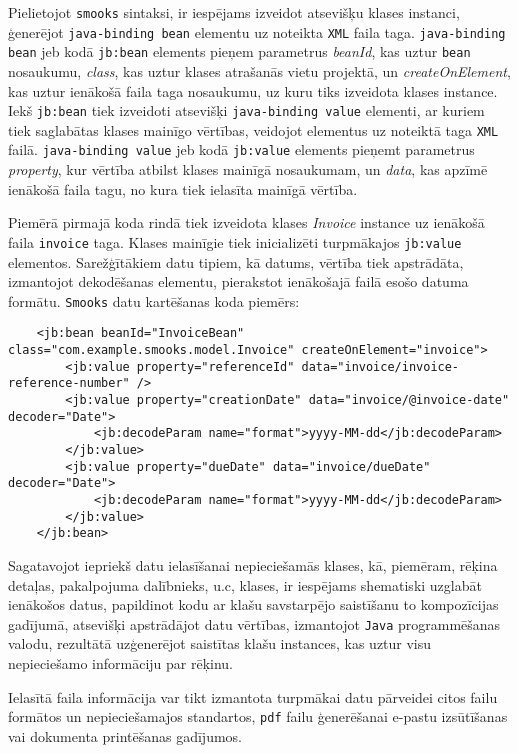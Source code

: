 \par Pielietojot \texttt{smooks} sintaksi, ir iespējams izveidot atsevišķu klases instanci, ģenerējot \texttt{java-binding bean} elementu uz noteikta \texttt{XML} faila taga. \texttt{java-binding bean} jeb kodā \texttt{jb:bean} elements pieņem parametrus \textit{beanId}, kas uztur \texttt{bean} nosaukumu, \textit{class}, kas uztur klases atrašanās vietu projektā, un \textit{createOnElement}, kas uztur ienākošā faila taga nosaukumu, uz kuru tiks izveidota klases instance. Iekš \texttt{jb:bean} tiek izveidoti atsevišķi \texttt{java-binding value} elementi, ar kuriem tiek saglabātas klases mainīgo vērtības, veidojot elementus uz noteiktā taga \texttt{XML} failā. \texttt{java-binding value} jeb kodā \texttt{jb:value} elements pieņemt parametrus \textit{property}, kur vērtība atbilst klases mainīgā nosaukumam, un \textit{data}, kas apzīmē ienākošā faila tagu, no kura tiek ielasīta mainīgā vērtība.
\par Piemērā pirmajā koda rindā tiek izveidota klases \textit{Invoice} instance uz ienākošā faila \texttt{invoice} taga. Klases mainīgie tiek inicializēti turpmākajos \texttt{jb:value} elementos. Sarežģītākiem datu tipiem, kā datums, vērtība tiek apstrādāta, izmantojot dekodēšanas elementu, pierakstot ienākošajā failā esošo datuma formātu. \texttt{Smooks} datu kartēšanas koda piemērs:
{
\begin{verbatim}
    <jb:bean beanId="InvoiceBean" class="com.example.smooks.model.Invoice" createOnElement="invoice">
        <jb:value property="referenceId" data="invoice/invoice-reference-number" />
        <jb:value property="creationDate" data="invoice/@invoice-date" decoder="Date">
            <jb:decodeParam name="format">yyyy-MM-dd</jb:decodeParam>
        </jb:value>
        <jb:value property="dueDate" data="invoice/dueDate" decoder="Date">
            <jb:decodeParam name="format">yyyy-MM-dd</jb:decodeParam>
        </jb:value>
    </jb:bean>
\end{verbatim}
}

\par Sagatavojot iepriekš datu ielasīšanai nepieciešamās klases, kā, piemēram, rēķina detaļas, pakalpojuma dalībnieks, u.c, klases, ir iespējams shematiski uzglabāt ienākošos datus, papildinot kodu ar klašu savstarpējo saistīšanu to kompozīcijas gadījumā, atsevišķi apstrādājot datu vērtības, izmantojot \texttt{Java} programmēšanas valodu, rezultātā uzģenerējot saistītas klašu instances, kas uztur visu nepieciešamo informāciju par rēķinu.
\par Ielasītā faila informācija var tikt izmantota turpmākai datu pārveidei citos failu formātos un nepieciešamajos standartos, \texttt{pdf} failu ģenerēšanai e-pastu izsūtīšanas vai dokumenta printēšanas gadījumos.


